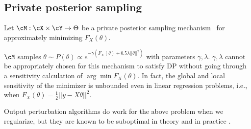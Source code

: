 


\subsection{Private posterior sampling}
\label{subsection:private_posterior_sampling}


\begin{example}\label{exp: posterior}
Let $\cM: \cX\times \cY \to \Theta $ be a private posterior sampling   mechanism~\citep{minami2016differential,wang2015privacy,gopi2022private} for approximately minimizing $F_{X}(\theta)$.

$\cM$ samples $\theta \sim P(\theta)\propto e^{-\gamma(F_X(\theta)+ 0.5\lambda ||\theta||^2)}$ with parameters $\gamma, \lambda$. $\gamma,\lambda$ cannot be appropriately chosen for this mechanism to satisfy DP without going through a sensitivity calculation of $\arg\min F_X(\theta)$. In fact, the global and local sensitivity of the minimizer is unbounded even in linear regression problems, i.e., when $F_X(\theta) = \frac{1}{2}||y-X\theta||^2.$ 

\end{example}
Output perturbation algorithms do work for the above problem when we regularize, but they are known to be suboptimal in theory and in practice \cite{chaudhuri2011differentially}.
 



